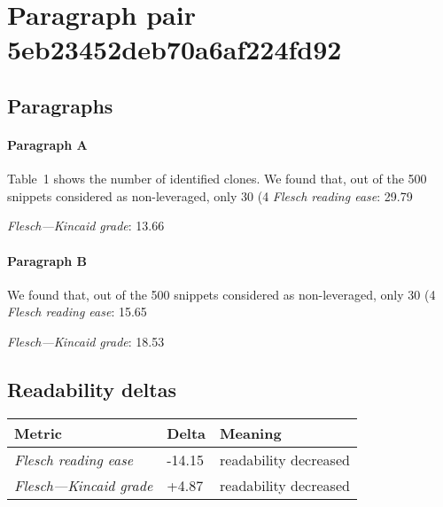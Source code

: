\section{Paragraph pair 5eb23452deb70a6af224fd92}
\subsection{Paragraphs}
\paragraph{Paragraph A}
Table 1 shows the number of identified clones. We found that, out of the 500 snippets considered as non-leveraged, only 30 (4%
\emph{Flesch reading ease}: 29.79\par
\emph{Flesch---Kincaid grade}: 13.66

\paragraph{Paragraph B}
We found that, out of the 500 snippets considered as non-leveraged, only 30 (4%
\emph{Flesch reading ease}: 15.65\par
\emph{Flesch---Kincaid grade}: 18.53

\subsection{Readability deltas}

\begin{tabular}{lll}
\toprule
               \textbf{Metric} & \textbf{Delta} &       \textbf{Meaning} \\
\midrule
    \emph{Flesch reading ease} &         -14.15 &  readability decreased \\
 \emph{Flesch---Kincaid grade} &          +4.87 &  readability decreased \\
\bottomrule
\end{tabular}

